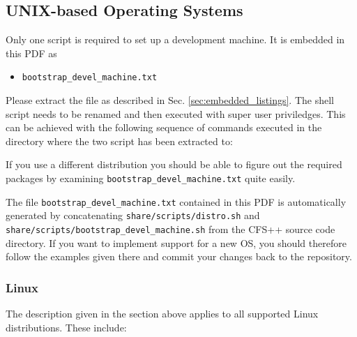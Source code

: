 \subsection{UNIX-based Operating Systems}

Only one script is required to set up a development machine. It is embedded in
this PDF as
\begin{itemize}
\item                    {\tt                   bootstrap\_devel\_machine.txt}
\end{itemize}%
%
Please extract the file  as described in Sec. \ref{sec:embedded_listings}. The
shell  script  needs  to  be   renamed  and  then  executed  with  super  user
priviledges.  This can  be achieved  with the  following sequence  of commands
executed in the directory where the two script has been extracted to:



If  you use a  different distribution  you should  be able  to figure  out the
required  packages  by  examining  {\tt  bootstrap\_devel\_machine.txt}  quite
easily.

The  file  {\tt  bootstrap\_devel\_machine.txt}   contained  in  this  PDF  is
automatically  generated by  concatenating  {\tt share/scripts/distro.sh}  and
{\tt  share/scripts/bootstrap\_devel\_machine.sh} from  the CFS++  source code
directory.   If  you want  to  implement  support for  a  new  OS, you  should
therefore follow the examples given there  and commit your changes back to the
repository.

\subsubsection{Linux}

The  description given in  the section  above applies  to all  supported Linux
distributions. These include:

